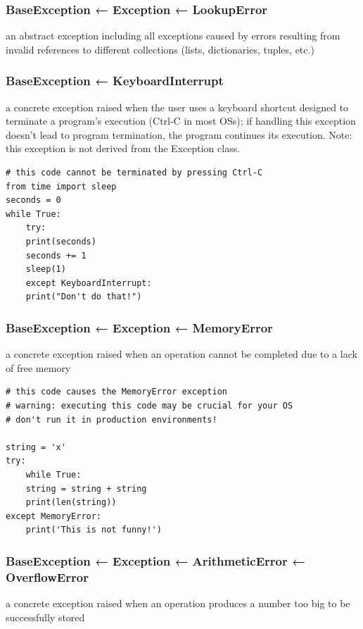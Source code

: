 \documentclass[11pt]{article}
\begin{document}
\subsubsection{BaseException ← Exception ← LookupError}
\label{sec:org4bd7724}
an abstract exception including all exceptions caused by errors
resulting from invalid references to different collections (lists,
dictionaries, tuples, etc.)

\subsubsection{BaseException ← KeyboardInterrupt}
\label{sec:orgd7be734}
a concrete exception raised when the user uses a keyboard shortcut
designed to terminate a program’s execution (Ctrl-C in most OSs); if
handling this exception doesn’t lead to program termination, the
program continues its execution. Note: this exception is not derived
from the Exception class.

\begin{verbatim}
# this code cannot be terminated by pressing Ctrl-C
from time import sleep
seconds = 0
while True:
    try:
	print(seconds)
	seconds += 1
	sleep(1)
    except KeyboardInterrupt:
	print("Don't do that!")
\end{verbatim}

\subsubsection{BaseException ← Exception ← MemoryError}
\label{sec:org815db98}
a concrete exception raised when an operation cannot be completed due
to a lack of free memory

\begin{verbatim}
# this code causes the MemoryError exception
# warning: executing this code may be crucial for your OS
# don't run it in production environments!

string = 'x'
try:
    while True:
	string = string + string
	print(len(string))
except MemoryError:
    print('This is not funny!')
\end{verbatim}

\subsubsection{BaseException ← Exception ← ArithmeticError ← OverflowError}
\label{sec:org8101f7e}
a concrete exception raised when an operation produces a number too
big to be successfully stored
\end{document}
